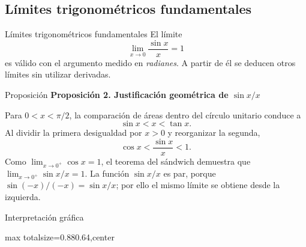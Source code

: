 \documentclass[12pt,aspectratio=169]{beamer}
\begin{document}
\subsection{Límites trigonométricos fundamentales}

\begin{frame}[t,allowframebreaks]{Límites trigonométricos fundamentales}
El límite
\[
 \boxed{\lim_{x\to0}\frac{\sin x}{x}=1}
\]
es válido con el argumento medido en \emph{radianes}. A partir de él se deducen otros límites sin utilizar derivadas.
\end{frame}


\begin{frame}[t,allowframebreaks]{Proposición}
{\color{azul}\bfseries Proposición 2. Justificación geométrica de $\sin x/x$}\par\medskip

Para $0<x<\pi/2$, la comparación de áreas dentro del círculo unitario conduce a
\[
 \sin x<x<\tan x.
\]
Al dividir la primera desigualdad por $x>0$ y reorganizar la segunda,
\[
 \cos x<\frac{\sin x}{x}<1.
\]
Como $\lim_{x\to0^+}\cos x=1$, el teorema del sándwich demuestra que $\lim_{x\to0^+}\sin x/x=1$. La función $\sin x/x$ es par, porque $\sin(-x)/(-x)=\sin x/x$; por ello el mismo límite se obtiene desde la izquierda.
\end{frame}


\begin{frame}[t,allowframebreaks]{Interpretación gráfica}
\begin{center}
\begin{adjustbox}{max totalsize={0.88\linewidth}{0.64\textheight},center}\end{adjustbox}
\end{center}
\end{frame}
\end{document}
